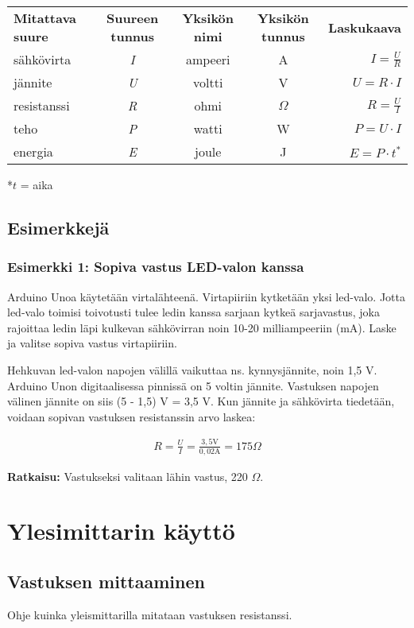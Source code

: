 \begin{tcolorbox}[colback=blue!10,colbacktitle=purple!90,title=\section*{Suureet}]

\begin{tabular}{ l{2.5cm}  c{1.5cm} c{2cm} c{1.5cm} r{3cm}   }
\textbf{ Mitattava suure}    &   \textbf{Suureen tunnus}    &   \textbf{Yksikön nimi}  & \textbf{Yksikön tunnus} & \textbf{Laskukaava}  \\

sähkövirta  &   \textit{I}   &    ampeeri    &    A  &  $\displaystyle I=\frac{U}{R} $ \\
jännite &    \textit{U}  &	voltti  &	V   &	$\displaystyle U=R \cdot I $    \\
resistanssi & 	\textit{R }  &	ohmi    &  $\Omega$   &	$\displaystyle  R=\frac{U}{I}  $  \\
teho    &   \textit{P}   &	watti   & 	W   &	$P=U\cdot I$     \\
energia &	\textit{E}    &	joule   &	  J &	 $E=P\cdot t^*$  
\end{tabular}

*$t$ = aika

\end{tcolorbox}

\subsection*{Esimerkkejä}
\subsubsection*{Esimerkki 1: Sopiva vastus LED-valon kanssa}

Arduino Unoa käytetään virtalähteenä. Virtapiiriin kytketään yksi led-valo. Jotta led-valo toimisi toivotusti tulee ledin kanssa sarjaan kytkeä
sarjavastus, joka rajoittaa ledin läpi kulkevan sähkövirran noin 10-20 milliampeeriin (mA). Laske ja valitse sopiva vastus virtapiiriin.

Hehkuvan led-valon napojen välillä vaikuttaa ns. kynnysjännite, noin 1,5 V. Arduino Unon digitaalisessa pinnissä on 5
voltin jännite. Vastuksen napojen välinen jännite on siis (5 - 1,5) V = 3,5 V. Kun jännite ja sähkövirta
tiedetään, voidaan sopivan vastuksen resistanssin arvo laskea:

\begin{align*}
    R = \frac{U}{I} = \frac{3{,}5\text{V}}{0{,}02\text{A}} = 175\Omega
\end{align*}

\textbf{Ratkaisu:} Vastukseksi valitaan lähin vastus, 220 $\Omega$. 

\section{Ylesimittarin käyttö}
\subsection*{Vastuksen mittaaminen}
Ohje kuinka yleismittarilla mitataan vastuksen resistanssi.